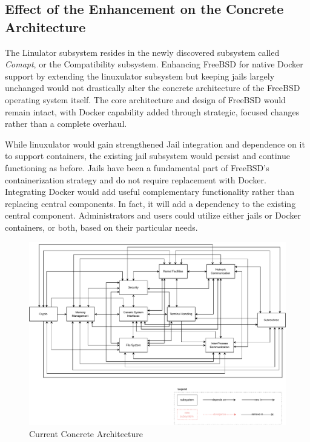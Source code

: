 \documentclass[12pt, dvipsnames, a4paper]{article}
\begin{document}
\subsection{Effect of the Enhancement on the Concrete Architecture}
The Linulator subsystem resides in the newly discovered subsystem called \emph{Comapt}, or the Compatibility subsystem. Enhancing FreeBSD for native Docker support by extending the linuxulator subsystem but keeping jails largely unchanged would not drastically alter the concrete architecture of the FreeBSD operating system itself. The core architecture and design of FreeBSD would remain intact, with Docker capability added through strategic, focused changes rather than a complete overhaul.

While linuxulator would gain strengthened Jail integration and dependence on it to support containers, the existing jail subsystem would persist and continue functioning as before. Jails have been a fundamental part of FreeBSD's containerization strategy and do not require replacement with Docker. Integrating Docker would add useful complementary functionality rather than replacing central components. In fact, it will add a dependency to the existing central component. Administrators and users could utilize either jails or Docker containers, or both, based on their particular needs.

\begin{figure}[!htb]
	\center
	\includegraphics[width = 500pt]{assets/architecture_diagrams/current-concrete-architecture.pdf}
	\caption{Current Concrete Architecture}
\end{figure}
\end{document}
